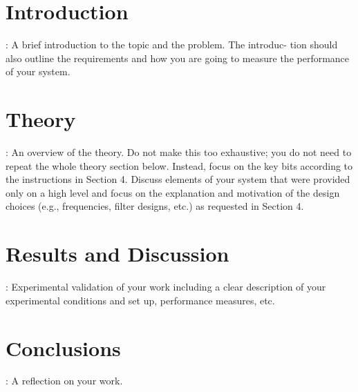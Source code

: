 \documentclass{article}[11]
\begin{document}
\section{Introduction}
: A brief introduction to the topic and the problem. The introduc-
tion should also outline the requirements and how you are going to measure the
performance of your system.
\section{Theory}
: An overview of the theory. Do not make this too exhaustive; you do not
need to repeat the whole theory section below. Instead, focus on the key bits
according to the instructions in Section 4. Discuss elements of your system that
were provided only on a high level and focus on the explanation and motivation of
the design choices (e.g., frequencies, filter designs, etc.) as requested in Section 4.
\section{Results and Discussion}
: Experimental validation of your work including a clear
description of your experimental conditions and set up, performance measures, etc.
\section{Conclusions}: A reflection on your work.
\end{document}
